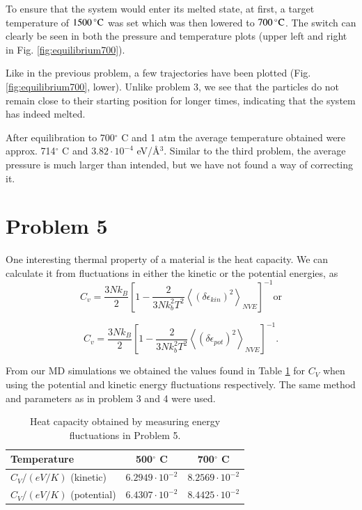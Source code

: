 To ensure that the system would enter its melted state, at first, a target temperature of $\unit[1500]{^\circ C}$ was set which was then lowered to $\unit[700]{^\circ C}$. The switch can clearly be seen in both the pressure and temperature plots (upper left and right in Fig. \ref{fig:equilibrium700}).

Like in the previous problem, a few trajectories have been plotted (Fig. \ref{fig:equilibrium700}, lower). Unlike problem 3, we see that the particles do not remain close to their starting position for longer times, indicating that the system has indeed melted.

After equilibration to 700$^\circ$ C and 1 atm the average temperature obtained were approx. 714$^\circ$ C and $3.82 \cdot 10^{-4}$ eV/\r{A}$^3$. Similar to the third problem, the average pressure is much larger than intended, but we have not found a way of correcting it.

\section*{Problem 5}

\noindent One interesting thermal property of a material is the heat capacity. We can calculate it from fluctuations in either the kinetic or the potential energies, as
\begin{equation}
C_v=\frac{3Nk_B}{2}\left[1-\frac{2}{3Nk_b^2T^2}\left\langle \left(\delta \epsilon_{kin}\right)^2  \right\rangle_{NVE} \right]^{-1} \text{or}
\label{eq:prob5-1}
\end{equation}

\begin{equation}
C_v=\frac{3Nk_B}{2}\left[1-\frac{2}{3Nk_b^2T^2}\left\langle \left(\delta \epsilon_{pot}\right)^2  \right\rangle_{NVE} \right]^{-1}.
\label{eq:prob5-2}
\end{equation}

From our MD simulations we obtained the values found in {Table \ref{tab:prob5}} for $C_V$ when using the potential and kinetic energy fluctuations respectively. The same method and parameters as in problem 3 and 4 were used.

\begin{table}[H]
	\centering
	\caption{Heat capacity obtained by measuring energy fluctuations in Problem 5.}
	\begin{tabular}{l|cc}
		\hline \textbf{Temperature} & \textbf{500$^\circ$ C} & \textbf{700$^\circ$ C} \\ \hline
		$C_V / (\unit{eV/K})$ (kinetic) & $ 6.2949 \cdot 10^{-2}$ & $ 8.2569 \cdot 10^{-2}$ \\
		$C_V / (\unit{eV/K})$ (potential) & $ 6.4307 \cdot 10^{-2}$ & $ 8.4425 \cdot 10^{-2}$ \\ \hline
	\end{tabular}
	\label{tab:prob5}
\end{table}

